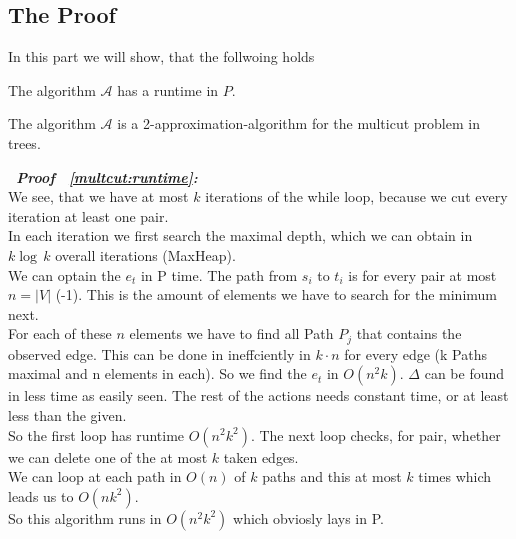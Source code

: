 \subsection*{The Proof}

In this part we will show, that the follwoing holds\\

\begin{lemma}\label{multcut:runtime}
The algorithm $\mathcal{A}$ has a runtime in $P$.
\end{lemma}
\begin{lemma}\label{multcut:apx}
The algorithm $\mathcal{A}$ is a 2-approximation-algorithm
for the multicut problem in trees.
\end{lemma}

\begin{description}
   \item{\bfseries\itshape~Proof ~\ref{multcut:runtime}:}\\
      We see, that we have at most $k$ iterations of the while loop,
      because we cut every iteration at least one pair.\\
      In each iteration we first search the maximal depth, which we can
      obtain in $k \log \, k$ overall iterations (MaxHeap).\\
      We can optain the $e_t$ in P time. The path from $s_i$ to $t_i$
      is for every pair at most $n = |V|$ (-1). This is the amount
      of elements we have to search for the minimum next.\\
      For each of these $n$ elements we have to find all Path $P_j$
      that contains the observed edge. This can be done in ineffciently in
      $k \cdot n$ for every edge (k Paths maximal and n elements in each).
      So we find the $e_t$ in $O(n^2 k)$. $\Delta$ can be found in less
      time as easily seen. The rest of the actions needs constant time,
      or at least less than the given.\\
      So the first loop has runtime $O(n^2k^2)$. The next loop checks, for
      pair, whether we can delete one of the at most $k$ taken edges.\\
      We can loop at each path in $O(n)$ of $k$ paths and this at most $k$ times
      which leads us to $O(nk^2)$.\\
      So this algorithm runs in $O(n^2k^2)$ which obviosly lays in P.


\end{description}
